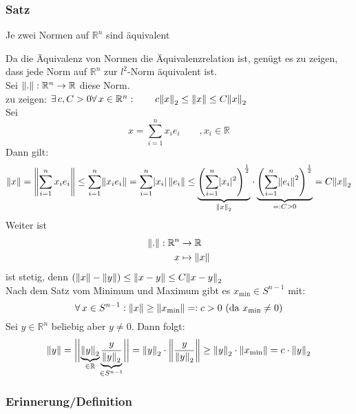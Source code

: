 \subsubsection{Satz} %
\label{ssub:satz}
Je zwei Normen auf $\mathbb{R}^n$ sind äquivalent

Da die Äquivalenz von Normen die Äquivalenzrelation ist, genügt es zu zeigen, dass jede Norm auf $\mathbb{R}^n$ zur $l^2$-Norm äquivalent ist. \\
Sei $\norm{.}:\mathbb{R}^n \to  \mathbb{R}$ diese Norm. \\
zu zeigen: $\exists\, c,C>0 \forall\, x \in \mathbb{R}^n: \qquad c \norm{x}_2 \leq \norm{x} \leq C \norm{x}_2$ \\
Sei \[
	x = \sum^{n}_{i=1}x_ie_i \qquad , x_i \in \mathbb{R}
\]
Dann gilt:
\[
	\norm{x}= \norm{\sum^{n}_{i=1}x_ie_i} \leq \sum^{n}_{i=1}\norm{x_ie_i} = \sum^{n}_{i=1}\abs{x_i} \, \norm{e_i} 
	\leq \underset{\norm{x}_2}{\underbrace{\left(\sum^{n}_{i=1}\abs{x_i}^2  \right)^{\frac{1}{2}}}} \cdot
	 \underset{=:C >0}{\underbrace{\left(\sum^{n}_{i=1}\norm{e_i}^2  \right)^{\frac{1}{2}}}} = C \norm{x}_2
\]
Weiter ist 
\begin{align*}
	\norm{.}:\mathbb{R}^n &\to  \mathbb{R} \\
	x &\mapsto \norm{x}
\end{align*}
ist stetig, denn $(\norm{x}-\norm{y}) \leq \norm{x-y} \leq C \norm{x-y}_2$ \\
Nach dem Satz vom Minimum und Maximum gibt es $x_{\min} \in S^{n-1}$ mit: 
\[
	\forall\, x \in S^{n-1}: \norm{x} \geq \norm{x_{\min}} =: c>0 \text{ (da $x_{\min}\neq 0$)}
\]
Sei $y \in \mathbb{R}^n$ beliebig aber $y \neq 0$. Dann folgt:
\[
	\norm{y}= \bigg\vert\bigg\vert \underset{\in \mathbb{R}}{\underbrace{\norm{y}_2}} \underset{\in S^{n-1}}{\underbrace{\frac{y}{\norm{y}_2}}} \bigg\vert\bigg\vert  = \norm{y}_2 \cdot
	 \norm{\frac{y}{\norm{y}_2}} \geq \norm{y}_2 \cdot \norm{x_{\min}} = c \cdot \norm{y}_2
	\]
	\bewende


\subsubsection{Erinnerung/Definition} %
\label{ssub:erinnerung_definition}

